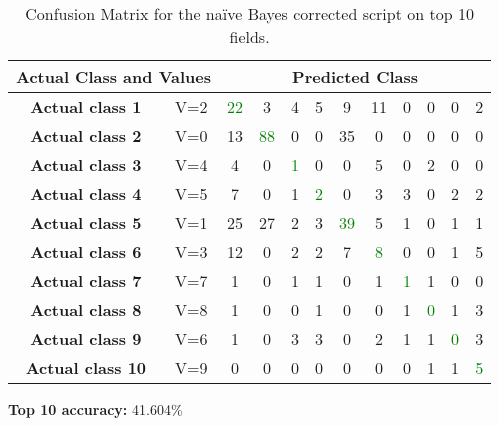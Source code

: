 \documentclass[a4paper,10pt]{article}
\begin{document}
      \begin{table}[ht!] 
        \centering
        \caption{Confusion Matrix for the na\"{i}ve Bayes corrected script on top 10 fields.} 
        \begin{tabular}{|c|c||c|c|c|c|c|c|c|c|c|c|}
          \hline    
          \multicolumn{2}{|c||}{\textbf{Actual Class and Values}}& \multicolumn{10}{|c|}{\textbf{Predicted Class}} \\
          \hline 
          \textbf{Actual class 1} & V=2 &\textcolor{green}{22} &3 &4 &5 &9 &11 &0 &0 &0 &2   \\
          \textbf{Actual class 2} & V=0 &13 &\textcolor{green}{88} &0 &0 &35 &0 &0 &0 &0 &0  \\
          \textbf{Actual class 3} & V=4 &4 &0 &\textcolor{green}{1} &0 &0 &5 &0 &2 &0 &0  \\
          \textbf{Actual class 4} & V=5 &7 &0 &1 &\textcolor{green}{2} &0 &3 &3 &0 &2 &2  \\
          \textbf{Actual class 5} & V=1 &25 &27 &2 &3 &\textcolor{green}{39} &5 &1 &0 &1 &1    \\
          \textbf{Actual class 6} & V=3 &12 &0 &2 &2 &7 &\textcolor{green}{8} &0 &0 &1 &5    \\
          \textbf{Actual class 7} & V=7 &1 &0 &1 &1 &0 &1 &\textcolor{green}{1} &1 &0 &0   \\
          \textbf{Actual class 8} & V=8 &1 &0 &0 &1 &0 &0 &1 &\textcolor{green}{0} &1 &3   \\
          \textbf{Actual class 9} & V=6 &1 &0 &3 &3 &0 &2 &1 &1 &\textcolor{green}{0} &3   \\
          \textbf{Actual class 10}& V=9 &0 &0 &0 &0 &0 &0 &0 &1 &1 &\textcolor{green}{5}   \\
          \hline
        \end{tabular}
      \end{table}
      \textbf{Top 10 accuracy:} 41.604\% 
\end{document}
